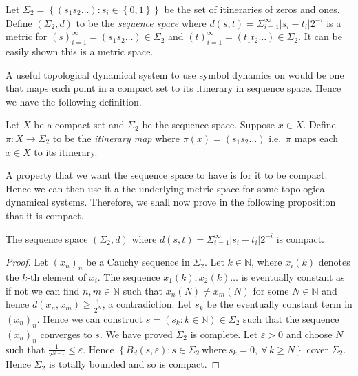 \begin{defn} \label{defn:sequence-space}
    Let $\Sigma_2 = \left\lbrace (s_1s_2\dots): s_i \in \left\lbrace 0, 1 \right\rbrace \right\rbrace$ be the set of itineraries of zeros and ones. Define $(\Sigma_2, d)$ to be the \emph{sequence space} where $d(s, t) = \Sigma_{i=1}^{\infty}|s_i - t_i|2^{-i}$ is a metric for $(s)_{i=1}^{\infty} = (s_1s_2\dots) \in \Sigma_2$ and $(t)_{i=1}^{\infty} = (t_1t_2\dots) \in \Sigma_2$. It can be easily shown this is a metric space.
\end{defn}

A useful topological dynamical system to use symbol dynamics on would be one that maps each point in a compact set to its itinerary in sequence space. Hence we have the following definition.

\begin{defn} \label{defn:itinerary-map}
    Let $X$ be a compact set and $\Sigma_2$ be the sequence space. Suppose $x \in X$. Define $\pi : X \to \Sigma_2$ to be the \emph{itinerary map} where $\pi(x) = (s_1s_2\dots)$ i.e.\ $\pi$ maps each $x \in X$ to its itinerary.
\end{defn}

A property that we want the sequence space to have is for it to be compact. Hence we can then use it a the underlying metric space for some topological dynamical systems. Therefore, we shall now prove in the following proposition that it is compact.

\begin{prop}
    The sequence space $(\Sigma_2, d)$ where $d(s, t) = \Sigma_{i=1}^{\infty}|s_i - t_i|2^{-i}$ is compact.
    \begin{proof}
        Let $(x_n)_n$ be a Cauchy sequence in $\Sigma_2$. Let $k \in \mathbb{N}$, where $x_i(k)$ denotes the $k$-th element of $x_i$. The sequence $x_1(k),x_2(k)\dots$ is eventually constant as if not we can find $n, m \in \mathbb{N}$ such that $x_n(N) \neq x_m(N)$ for some $N \in \mathbb{N}$ and hence $d(x_n, x_m) \geq \frac{1}{2^N}$, a contradiction. Let $s_k$ be the eventually constant term in $(x_n)_n$. Hence we can construct $s = ( s_k : k \in \mathbb{N} ) \in \Sigma_2$ such that the sequence $(x_n)_n$ converges to $s$. We have proved $\Sigma_2$ is complete. Let $\varepsilon > 0$ and choose $N$ such that $\frac{1}{2^{N - 1}} \leq \varepsilon$. Hence $\left\lbrace B_d(s, \varepsilon) : s \in \Sigma_2 \ \text{where} \ s_k = 0, \ \forall\, k \geq N\right\rbrace$ cover $\Sigma_2$. Hence $\Sigma_2$ is totally bounded and so is compact.
    \end{proof}
\end{prop}

